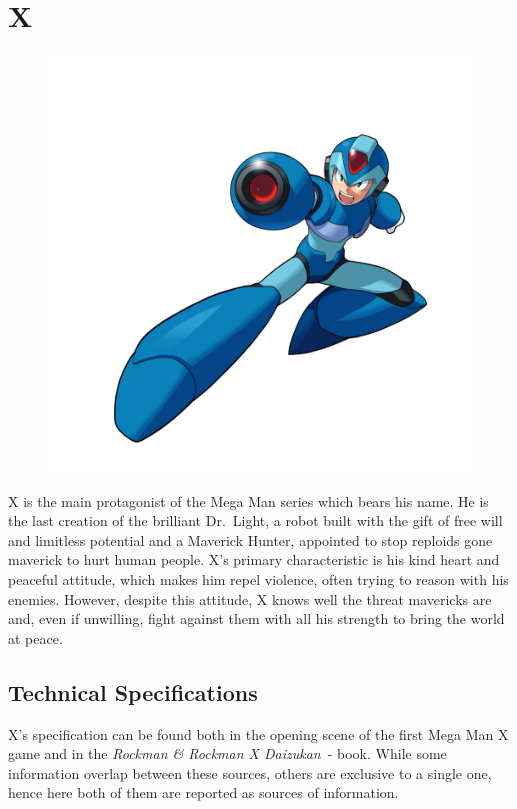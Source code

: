 \chapter{X}\label{char:X}
\begin{figure}[h]
	\centering
	\includegraphics[width=0.6\linewidth]{figures/Characters/Char_MMX.png}
\end{figure}

X is the main protagonist of the Mega Man series which bears his name. He is the last creation of the brilliant Dr.~Light, a robot built with the gift of free will and limitless potential and a Maverick Hunter, appointed to stop reploids gone maverick to hurt human people. 
X's primary characteristic is his kind heart and peaceful attitude, which makes him repel violence, often trying to reason with his enemies. However, despite this attitude, X knows well the threat mavericks are and, even if unwilling, fight against them with all his strength to bring the world at peace.

\section{Technical Specifications}
X's specification can be found both in the opening scene of the first Mega Man X game and in the \emph{Rockman \& Rockman X Daizukan}~\cite{book:RRXD}-\cite{X_specs_translated} book. While some information overlap between these sources, others are exclusive to a single one, hence here both of them are reported as sources of information.


